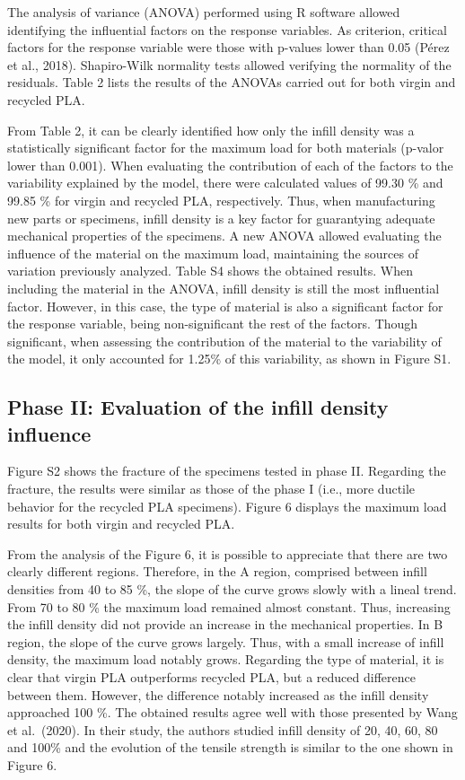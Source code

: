 \documentclass[]{elsarticle} %
\begin{document}
The analysis of variance (ANOVA) performed using R software allowed
identifying the influential factors on the response variables. As
criterion, critical factors for the response variable were those with
p-values lower than 0.05 (Pérez et al., 2018). Shapiro-Wilk normality
tests allowed verifying the normality of the residuals. Table 2 lists
the results of the ANOVAs carried out for both virgin and recycled PLA.

From Table 2, it can be clearly identified how only the infill density
was a statistically significant factor for the maximum load for both
materials (p-valor lower than 0.001). When evaluating the contribution
of each of the factors to the variability explained by the model, there
were calculated values of 99.30 \% and 99.85 \% for virgin and recycled
PLA, respectively. Thus, when manufacturing new parts or specimens,
infill density is a key factor for guarantying adequate mechanical
properties of the specimens. A new ANOVA allowed evaluating the
influence of the material on the maximum load, maintaining the sources
of variation previously analyzed. Table S4 shows the obtained results.
When including the material in the ANOVA, infill density is still the
most influential factor. However, in this case, the type of material is
also a significant factor for the response variable, being
non-significant the rest of the factors. Though significant, when
assessing the contribution of the material to the variability of the
model, it only accounted for 1.25\% of this variability, as shown in
Figure S1.

\hypertarget{phase-ii-evaluation-of-the-infill-density-influence}{%
\subsection{Phase II: Evaluation of the infill density
influence}\label{phase-ii-evaluation-of-the-infill-density-influence}}

Figure S2 shows the fracture of the specimens tested in phase II.
Regarding the fracture, the results were similar as those of the phase I
(i.e., more ductile behavior for the recycled PLA specimens). Figure 6
displays the maximum load results for both virgin and recycled PLA.

From the analysis of the Figure 6, it is possible to appreciate that
there are two clearly different regions. Therefore, in the A region,
comprised between infill densities from 40 to 85 \%, the slope of the
curve grows slowly with a lineal trend. From 70 to 80 \% the maximum
load remained almost constant. Thus, increasing the infill density did
not provide an increase in the mechanical properties. In B region, the
slope of the curve grows largely. Thus, with a small increase of infill
density, the maximum load notably grows. Regarding the type of material,
it is clear that virgin PLA outperforms recycled PLA, but a reduced
difference between them. However, the difference notably increased as
the infill density approached 100 \%. The obtained results agree well
with those presented by Wang et al.~(2020). In their study, the authors
studied infill density of 20, 40, 60, 80 and 100\% and the evolution of
the tensile strength is similar to the one shown in Figure 6.
\end{document}
